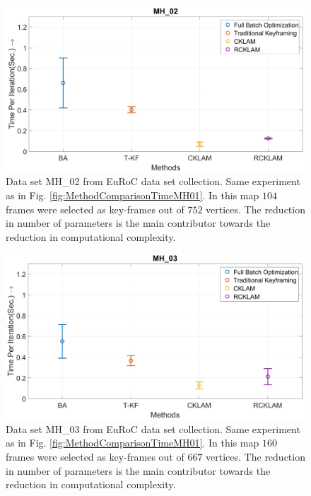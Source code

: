 \begin{figure}
	\centering
		\includegraphics[width=1.00\textwidth]{images/MethodComparisonTimeMH02.png}
  \caption{Data set MH\_02 from EuRoC \cite{Burri25012016} data set collection. Same experiment as in Fig. \ref{fig:MethodComparisonTimeMH01}. In this map $104$ frames were selected as key-frames out of $752$ vertices. The reduction in number of parameters is the main contributor towards the reduction in computational complexity.}
  \label{fig:MethodComparisonTimeMH02}
\end{figure}

\begin{figure}
	\centering
		\includegraphics[width=1.00\textwidth]{images/MethodComparisonTimeMH03.png}
  \caption{Data set MH\_03 from EuRoC \cite{Burri25012016} data set collection. Same experiment as in Fig. \ref{fig:MethodComparisonTimeMH01}. In this map $160$ frames were selected as key-frames out of $667$ vertices. The reduction in number of parameters is the main contributor towards the reduction in computational complexity.}
  \label{fig:MethodComparisonTimeMH03}
\end{figure}

